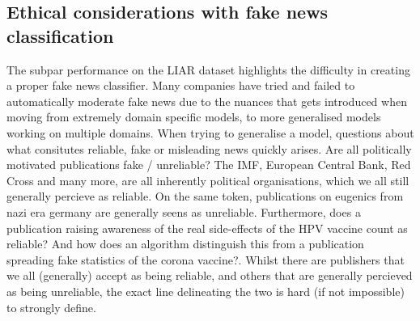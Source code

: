 \subsection{Ethical considerations with fake news classification}
The subpar performance on the LIAR dataset highlights the difficulty in creating a proper fake news classifier. Many
companies have tried and failed to automatically moderate fake news due to the nuances that gets introduced when moving
from extremely domain specific models, to more generalised models working on multiple domains. When trying to
generalise a model, questions about what consitutes reliable, fake or misleading news quickly arises. Are all
politically motivated publications fake / unreliable? The IMF, European Central Bank, Red Cross and many more, are all
inherently political organisations, which we all still generally percieve as reliable. On the same token, publications
on eugenics from nazi era germany are generally seens as unreliable. Furthermore, does a publication raising awareness
of the real side-effects of the HPV vaccine count as reliable? And how does an algorithm distinguish this from a
publication spreading fake statistics of the corona vaccine?. Whilst there are publishers that we all (generally)
accept as being reliable, and others that are generally percieved as being unreliable, the exact line delineating the
two is hard (if not impossible) to strongly define.
